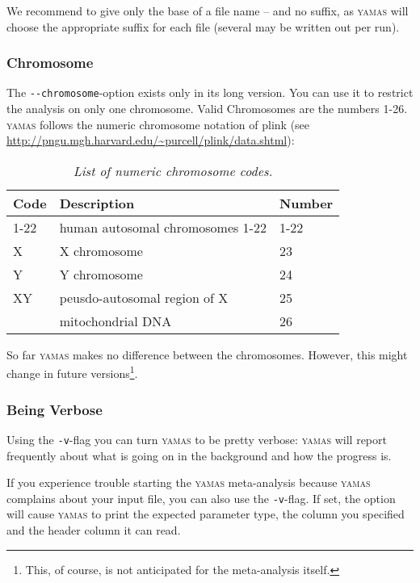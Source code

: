 We recommend to give only the base of a file name -- and no suffix, as \textsc{yamas} will choose the appropriate suffix for each file (several may be written out per run).

\subsubsection{Chromosome}
\label{usage:op:chromosome}
The \verb+--chromosome+-option exists only in its long version. You can use it to restrict the analysis on only one chromosome. Valid Chromosomes are the numbers 1-26. \textsc{yamas} follows the numeric chromosome notation of plink (see \url{http://pngu.mgh.harvard.edu/~purcell/plink/data.shtml}):

\begin{table}[H]
 \caption{\emph{List of numeric chromosome codes.}}
 \centering
\begin{tabular}{lll}
\rowcolor{light-gray}Code & Description & Number\\\hline
1-22  & human autosomal chromosomes 1-22  & 1-22\\
X     & X chromosome                      & 23\\
Y     & Y chromosome                      & 24\\
XY    & peusdo-autosomal region of X      & 25\\
      & mitochondrial DNA                 & 26\\
\end{tabular}
\end{table}
So far \textsc{yamas} makes no difference between the chromosomes. However, this might change in future versions\footnote{This, of course, is not anticipated for the meta-analysis itself.}.

\subsubsection{Being Verbose}
\label{usage:op:verbosity}
Using the \verb+-v+-flag you can turn \textsc{yamas} to be pretty verbose: \textsc{yamas} will report frequently about what is going on in the background and how the progress is.

If you experience trouble starting the \textsc{yamas} meta-analysis because \textsc{yamas} complains about your input file, you can also use the \verb+-v+-flag. If set, the option will cause \textsc{yamas} to print the expected parameter type, the column you specified and the header column it can read.

